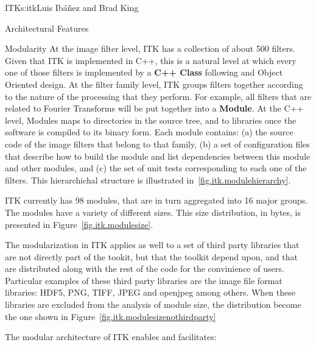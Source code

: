 \begin{aosachapter}{ITK}{s:itk}{Luis Ib\'{a}\~{n}ez and Brad King}
\begin{aosasect1}{Architectural Features}
\begin{aosasect2}{Modularity}
At the image filter level, ITK has a collection of about 500 filters. Given
that ITK is implemented in C++, this is a natural level at which every one of
those filters is implemented by a \textbf{C++ Class} following and Object
Oriented design.  At the filter family level, ITK groups filters together
according to the nature of the processing that they perform. For example, all
filters that are related to Fourier Transforms will be put together into a
\textbf{Module}.  At the C++ level, Modules maps to directories in the source
tree, and to libraries once the software is compiled to its binary form. Each
module contains: (a) the source code of the image filters that belong to that
family, (b) a set of configuration files that describe how to build the module
and list dependencies between this module and other modules, and (c) the set of
unit tests corresponding to each one of the filters.  This hierarchichal
structure is illustrated in~\ref{fig.itk.modulehierarchy}.



ITK currently has 98 modules, that are in turn aggregated into 16 major groups.
The modules have a variety of different sizes. This size distribution, in
bytes, is presented in Figure~\ref{fig.itk.modulesize}.


The modularization in ITK applies as well to a set of third party libraries
that are not directly part of the tookit, but that the toolkit depend upon, and
that are distributed along with the rest of the code for the convinience of
users. Particular examples of these third party libraries are the image file
format libraries: HDF5, PNG, TIFF, JPEG and openjpeg among others. When these
libraries are excluded from the analysis of module size, the distribution
become the one shown in Figure~\ref{fig.itk.modulesizenothirdparty}


The modular architecture of ITK enables and facilitates:


\end{aosasect2}
\end{aosasect1}
\end{aosachapter}
